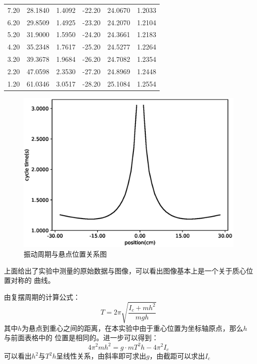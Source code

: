 \documentclass[a4paper]{ctexart}
\begin{document}
\begin{table}[htbp]
\begin{tabular}{cccccc}
            7.20 & 28.1840 & 1.4092 & -22.20 & 24.0670 & 1.2033 \\
            6.20 & 29.8509 & 1.4925 & -23.20 & 24.2070 & 1.2104 \\
            5.20 & 31.9000 & 1.5950 & -24.20 & 24.3661 & 1.2183 \\
            4.20 & 35.2348 & 1.7617 & -25.20 & 24.5277 & 1.2264 \\
            3.20 & 39.3678 & 1.9684 & -26.20 & 24.7082 & 1.2354 \\
            2.20 & 47.0598 & 2.3530 & -27.20 & 24.8969 & 1.2448 \\
            1.20 & 61.0346 & 3.0517 & -28.20 & 25.1084 & 1.2554 \\
            \bottomrule[1.5pt]
        \end{tabular}
    \end{table}
    \par 
    \begin{figure}[htbp]
        \centering
        \includegraphics[scale=0.65]{data_original.eps}
        \caption{振动周期与悬点位置关系图}
    \end{figure}
    \par 
    上面给出了实验中测量的原始数据与图像，可以看出图像基本上是一个关于质心位置对称的
    曲线。
    \par 
    由复摆周期的计算公式：
    $$
    T = 2 \pi \sqrt{\frac{I_{c} + mh^{2}}{mgh}}
    $$
    其中$h$为悬点到重心之间的距离，在本实验中由于重心位置为坐标轴原点，那么$h$与前面表格中的
    位置是相同的。进一步可以得到：
    $$
    4\pi^{2}mh^{2} = g\cdot mT^{2}h - 4\pi^{2}I_{c}
    $$
    可以看出$h^{2}$与$T^{2}h$呈线性关系，由斜率即可求出$g$，由截距可以求出$I_{c}$
\end{document}

